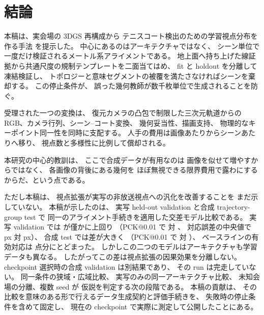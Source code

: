 \section{結論}
\label{sec:conclusion}

本稿は、実会場の 3DGS 再構成から
テニスコート検出のための学習視点分布を作る手法 \Method を提示した。
中心にあるのはアーキテクチャではなく、
シーン単位で一度だけ検証されるメートル系アライメントである。
地上面へ持ち上げた線証拠から共通尺度の規制テンプレートを二面当てはめ、
fit と holdout を分離して凍結検証し、
トポロジーと意味セグメントの被覆を満たさなければシーンを棄却する。
この停止条件が、
誤った幾何教師が数千枚単位で生成されることを防ぐ。

受理された一つの変換は、
復元カメラの凸包で制限した三次元軌道からの
RGB、カメラ行列、シーン--コート変換、
幾何妥当性、描画支持、
物理的なキーポイント同一性を同時に支配する。
人手の費用は画像あたりからシーンあたりへ移り、
視点数と多様性に比例して償却される。

本研究の中心的教訓は、
ここで合成データが有用なのは
画像を似せて増やすからではなく、
各画像の背後にある幾何を
ほぼ無視できる限界費用で露わにするからだ、という点である。

ただし本稿は、
視点拡張が実写の非放送視点への汎化を改善することを
まだ示していない。
本稿が示したのは、
実写 held-out validation と合成 trajectory-group test で
同一のアライメント手続きを適用した交差モデル比較である。
実写 validation では \Method が僅かに上回り
（PCK@0.01 で \resRealOursPckOne 対 \resRealTcdPckOne、
対応誤差の中央値で \resRealOursPairMedian px 対 \resRealTcdPairMedian px）、
合成 test では差が大きく
（PCK@0.01 で \resSynthOursPckOne 対 \resSynthTcdPckOne）、
ベースラインの有効対応は \resSynthTcdPairN 点分にとどまった。
しかしこの二つのモデルはアーキテクチャも学習データも異なる。
したがってこの差は視点拡張の因果効果を分離しない。
checkpoint 選択時の合成 validation は別結果であり、
その run は完走していない。
同一条件の狭域・広域比較、
実写のみの同一アーキテクチャ比較、
未知会場の分離、複数 seed が
仮説を判定する次の段階である。
本稿の貢献は、
その比較を意味のある形で行えるデータ生成契約と評価手続きを、
失敗時の停止条件を含めて固定し、
現在の checkpoint で実際に測定して公開したことにある。

